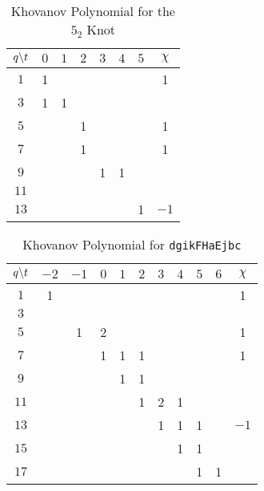 \documentclass{article}
\theoremstyle{plain}
\begin{document}
        \begin{table}[H]
            \centering
            \begin{tabular}{| c | c | c | c | c | c | c | c |}
                \hline
                $q\symbol{92}t$&$0$&$1$&$2$&$3$&$4$&$5$&$\chi$\\
                \hline
                $1$&1&&&&&&1\\
                \hline
                $3$&1&1&&&&&\\
                \hline
                $5$&&&1&&&&1\\
                \hline
                $7$&&&1&&&&1\\
                \hline
                $9$&&&&1&1&&\\
                \hline
                $11$&&&&&&&\\
                \hline
                $13$&&&&&&1&$-1$\\
                \hline
            \end{tabular}
            \caption{Khovanov Polynomial for the $5_{2}$ Knot}
            \label{table:m_3_kho}
        \end{table}
        \begin{table}[H]
            \centering
            \begin{tabular}{| c | c | c | c | c | c | c | c | c | c | c |}
                \hline
                $q\symbol{92}t$&$-2$&$-1$&$0$&$1$&$2$&$3$&$4$&$5$&$6$&$\chi$\\
                \hline
                $1$&1&&&&&&&&&1\\
                \hline
                $3$&&&&&&&&&&\\
                \hline
                $5$&&1&2&&&&&&&1\\
                \hline
                $7$&&&1&1&1&&&&&1\\
                \hline
                $9$&&&&1&1&&&&&\\
                \hline
                $11$&&&&&1&2&1&&&\\
                \hline
                $13$&&&&&&1&1&1&&$-1$\\
                \hline
                $15$&&&&&&&1&1&&\\
                \hline
                $17$&&&&&&&&1&1&\\
                \hline
            \end{tabular}
            \caption{Khovanov Polynomial for \texttt{dgikFHaEjbc}}
            \label{table:dgikFHaEjbc_kho}
        \end{table}
\end{document}
